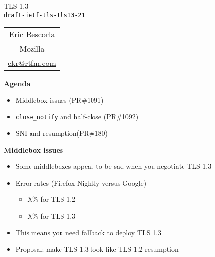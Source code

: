 \documentclass[helvetica]{seminar}
\newcommand{\heading}[1]{%
  \begin{center} 
    \large\bf 
    #1 
  \end{center} 
  \vspace{.4 in}}
\begin{document}
\begin{slide}
\begin{center}
\vspace{.5 in}
\LARGE{{\bf}TLS 1.3\\{\small \verb^draft-ietf-tls-tls13-21^}}\\
\vspace{.2in}
\large{
\begin{tabular}{c}
Eric Rescorla\\
Mozilla\\
\url{ekr@rtfm.com}
\end{tabular}
}
\end{center}
\end{slide}

\centerslidesfalse 

\begin{slide}
  \heading{Agenda}

  \begin{itemize}
  \item Middlebox issues (PR\#1091)
  \item \verb^close_notify^ and half-close (PR\#1092)
  \item SNI and resumption(PR\#180)
  \end{itemize}
\end{slide}


\begin{slide}
  \heading{Middlebox issues}

  \begin{itemize}
  \item Some middleboxes appear to be sad when you negotiate TLS 1.3
  \item Error rates (Firefox Nightly versus Google)
    \begin{itemize}
    \item X\% for TLS 1.2
    \item X\% for TLS 1.3
    \end{itemize}
  \item This means you need fallback to deploy TLS 1.3
  \item Proposal: make TLS 1.3 look like TLS 1.2 resumption
  \end{itemize}
\end{slide}
\end{document}
